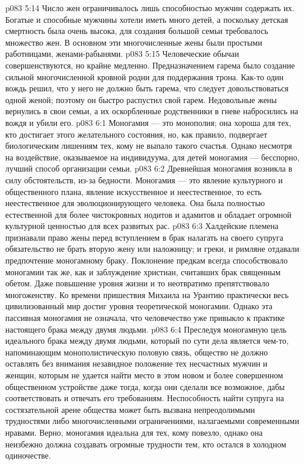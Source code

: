 \vs p083 5:14 Число жен ограничивалось лишь способностью мужчин содержать их. Богатые и способные мужчины хотели иметь много детей, а поскольку детская смертность была очень высока, для создания большой семьи требовалось множество жен. В основном эти многочисленные жены были простыми работницами, женами\hyp{}рабынями.
\vs p083 5:15 Человеческие обычаи совершенствуются, но крайне медленно. Предназначением гарема было создание сильной многочисленной кровной родни для поддержания трона. Как\hyp{}то один вождь решил, что у него не должно быть гарема, что следует довольствоваться одной женой; поэтому он быстро распустил свой гарем. Недовольные жены вернулись в свои семьи, а их оскорбленные родственники в гневе набросились на вождя и убили его.
\vs p083 6:1 Моногамия --- это монополия; она хороша для тех, кто достигает этого желательного состояния, но, как правило, подвергает биологическим лишениям тех, кому не выпало такого счастья. Однако несмотря на воздействие, оказываемое на индивидуума, для детей моногамия --- бесспорно, лучший способ организации семьи.
\vs p083 6:2 Древнейшая моногамия возникла в силу обстоятельств, из\hyp{}за бедности. Моногамия --- это явление культурного и общественного плана, явление искусственное и неестественное, то есть неестественное для эволюционирующего человека. Она была полностью естественной для более чистокровных нодитов и адамитов и обладает огромной культурной ценностью для всех развитых рас.
\vs p083 6:3 Халдейские племена признавали право жены перед вступлением в брак налагать на своего супруга обязательство не брать вторую жену или наложницу; и греки, и римляне отдавали предпочтение моногамному браку. Поклонение предкам всегда способствовало моногамии так же, как и заблуждение христиан, считавших брак священным обетом. Даже повышение уровня жизни и то неотвратимо препятствовало многоженству. Ко времени пришествия Михаила на Урантию практически весь цивилизованный мир достиг уровня теоретической моногамии. Однако эта пассивная моногамия не означала, что человечество уже привыкло к практике настоящего брака между двумя людьми.
\vs p083 6:4 \pc Преследуя моногамную цель идеального брака между двумя людьми, который по сути дела является чем\hyp{}то, напоминающим монополистическую половую связь, общество не должно оставлять без внимания незавидное положение тех несчастных мужчин и женщин, которым не удается найти место в этом новом и более совершенном общественном устройстве даже тогда, когда они сделали все возможное, дабы соответствовать и отвечать его требованиям. Неспособность найти супруга на состязательной арене общества может быть вызвана непреодолимыми трудностями либо многочисленными ограничениями, налагаемыми современными нравами. Верно, моногамия идеальна для тех, кому повезло, однако она неизбежно должна создавать огромные трудности тем, кто остался в холодном одиночестве.
